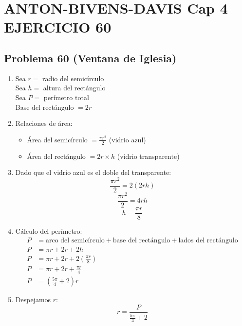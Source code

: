\chapter*{ANTON-BIVENS-DAVIS Cap 4 EJERCICIO 60}
\section*{Problema 60 (Ventana de Iglesia)}

\begin{enumerate}
    \item Sea $r = $ radio del semicírculo\\
    Sea $h = $ altura del rectángulo\\
    Sea $P = $ perímetro total\\
    Base del rectángulo $= 2r$
    
    \item Relaciones de área:
    \begin{itemize}
        \item Área del semicírculo $= \frac{\pi r^2}{2}$ (vidrio azul)
        \item Área del rectángulo $= 2r \times h$ (vidrio transparente)
    \end{itemize}
    
    \item Dado que el vidrio azul es el doble del transparente:
    \[\frac{\pi r^2}{2} = 2(2rh)\]
    \[\frac{\pi r^2}{2} = 4rh\]
    \[h = \frac{\pi r}{8}\]
    
    \item Cálculo del perímetro:
    \begin{align*}
        P &= \text{arco del semicírculo} + \text{base del rectángulo} + \text{lados del rectángulo}\\
        P &= \pi r + 2r + 2h\\
        P &= \pi r + 2r + 2(\frac{\pi r}{8})\\
        P &= \pi r + 2r + \frac{\pi r}{4}\\
        P &= (\frac{5\pi}{4} + 2)r
    \end{align*}
    
    \item Despejamos $r$:
    \[r = \frac{P}{\frac{5\pi}{4} + 2}\]
\end{enumerate}